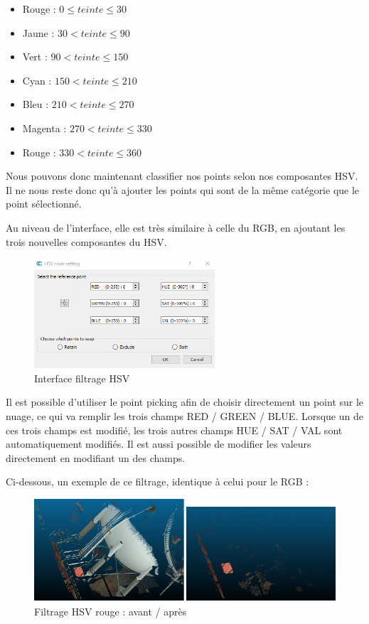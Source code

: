 \documentclass[12pt,titlepage,french]{article}
\begin{document}
\begin{itemize}
    \item Rouge : $0 \leq teinte \leq 30$
    \item Jaune : $30 < teinte \leq 90$
    \item Vert : $90 < teinte \leq 150$
    \item Cyan : $150 < teinte \leq 210$
    \item Bleu : $210 < teinte \leq 270$
    \item Magenta : $270 < teinte \leq 330$
    \item Rouge : $330 < teinte \leq 360$ \newline
\end{itemize}

Nous pouvons donc maintenant classifier nos points selon nos composantes HSV. Il ne nous reste donc qu'à ajouter les points qui sont de la même catégorie que le point sélectionné. \newline

Au niveau de l'interface, elle est très similaire à celle du RGB, en ajoutant les trois nouvelles composantes du HSV.

\begin{figure}[H]
\center \includegraphics[width=0.6\textwidth]{./img/ui_filter_hsv.PNG}
  \caption{\label{ui_hsv} Interface filtrage HSV}
\end{figure}

Il est possible d'utiliser le point picking afin de choisir directement un point sur le nuage, ce qui va remplir les trois champs RED / GREEN / BLUE. Lorsque un de ces trois champs est modifié, les trois autres champs HUE / SAT / VAL sont automatiquement modifiés. Il est aussi possible de modifier les valeurs directement en modifiant un des champs.

Ci-dessous, un exemple de ce filtrage, identique à celui pour le RGB :

\begin{figure}[H]
\center
\includegraphics[width=1\textwidth]{./img/hsv_avant_apres.PNG}
\caption{\label{application_hsv} Filtrage HSV rouge : avant / après}
\end{figure}
\end{document}
